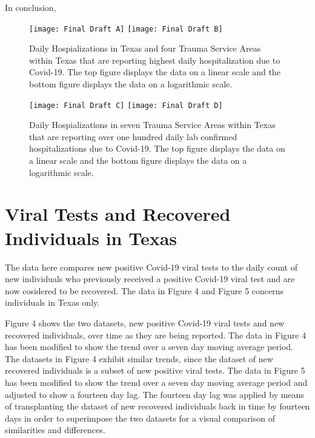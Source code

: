 \documentclass{article}
\begin{document}
\vspace{2mm}

In conclusion, 


\begin{figure}[!htbp]
	\begin{center}
		\texttt{[image: Final Draft A]}
		\vspace{1mm}
		\texttt{[image: Final Draft B]}
		\caption{Daily Hospializations in Texas and four Trauma Service Areas within Texas that are reporting highest daily hospitalization due to Covid-19. The top figure displays the data on a linear scale and the bottom figure displays the data on a logarithmic scale. }
		\label{fig:2}
	\end{center}
\end{figure}

\FloatBarrier

\begin{figure}[!htbp]
	\begin{center}
		\texttt{[image: Final Draft C]}
		\vspace{1mm}
		\texttt{[image: Final Draft D]}
		\caption{Daily Hospializations in seven Trauma Service Areas within Texas that are reporting over one hundred daily lab confirmed hospitalizations due to Covid-19. The top figure displays the data on a linear scale and the bottom figure displays the data on a logarithmic scale. }
		\label{fig:3}
	\end{center}
\end{figure}

\FloatBarrier

\section{Viral Tests and Recovered Individuals in Texas}

The data here compares new positive Covid-19 viral tests to the daily count of new individuals who previously received a positive Covid-19 viral test and are now cosidered to be recovered. The data in Figure 4 and Figure 5 concerns individuals in Texas only. 

\vspace{2mm}

Figure 4 shows the two datasets, new positive Covid-19 viral tests and new recovered individuals, over time as they are being reported. The data in Figure 4 has been modified to show the trend over a seven day moving average period. The datasets in Figure 4 exhibit similar trends, since the dataset of new recovered individuals is a subset of new positive viral tests. 
The data in Figure 5 has been modified to show the trend over a seven day moving average period and adjusted to show a fourteen day lag. The fourteen day lag was applied by means of transplanting the dataset of new recovered individuals back in time by fourteen days in order to superimpose the two datasets for a visual comparison of similarities and differences.
\end{document}
